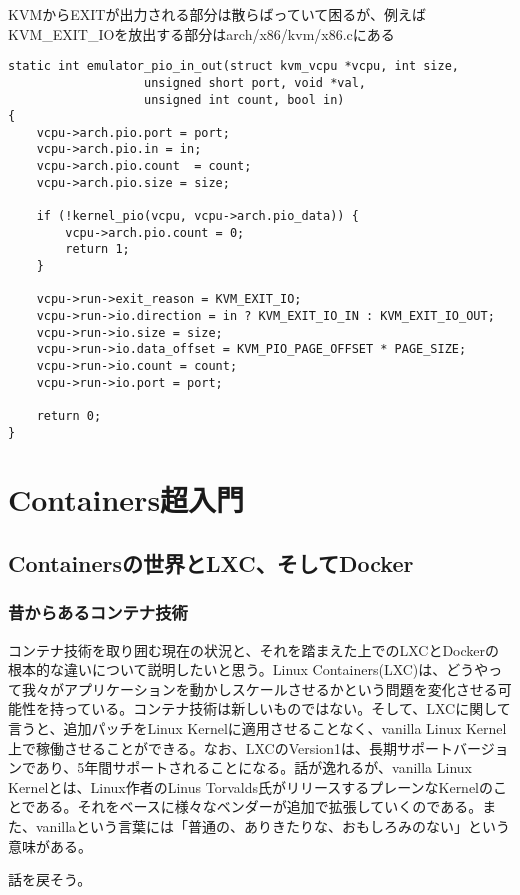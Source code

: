 \documentclass[9pt,b5paper,tombo]{jsbook}
\begin{document}
KVMからEXITが出力される部分は散らばっていて困るが、例えばKVM\_EXIT\_IOを放出する部分はarch/x86/kvm/x86.cにある

\begin{lstlisting}
static int emulator_pio_in_out(struct kvm_vcpu *vcpu, int size,
                   unsigned short port, void *val,
                   unsigned int count, bool in)
{
    vcpu->arch.pio.port = port;
    vcpu->arch.pio.in = in;
    vcpu->arch.pio.count  = count;
    vcpu->arch.pio.size = size;

    if (!kernel_pio(vcpu, vcpu->arch.pio_data)) {
        vcpu->arch.pio.count = 0;
        return 1;
    }

    vcpu->run->exit_reason = KVM_EXIT_IO;
    vcpu->run->io.direction = in ? KVM_EXIT_IO_IN : KVM_EXIT_IO_OUT;
    vcpu->run->io.size = size;
    vcpu->run->io.data_offset = KVM_PIO_PAGE_OFFSET * PAGE_SIZE;
    vcpu->run->io.count = count;
    vcpu->run->io.port = port;

    return 0;
}
\end{lstlisting}

\chapter{Containers超入門}

\section{Containersの世界とLXC、そしてDocker}

\subsection{昔からあるコンテナ技術}
コンテナ技術を取り囲む現在の状況と、それを踏まえた上でのLXCとDockerの根本的な違いについて説明したいと思う。Linux Containers(LXC)は、どうやって我々がアプリケーションを動かしスケールさせるかという問題を変化させる可能性を持っている。コンテナ技術は新しいものではない。そして、LXCに関して言うと、追加パッチをLinux Kernelに適用させることなく、vanilla Linux Kernel上で稼働させることができる。なお、LXCのVersion1は、長期サポートバージョンであり、5年間サポートされることになる。話が逸れるが、vanilla Linux Kernelとは、Linux作者のLinus Torvalds氏がリリースするプレーンなKernelのことである。それをベースに様々なベンダーが追加で拡張していくのである。また、vanillaという言葉には「普通の、ありきたりな、おもしろみのない」という意味がある。

\noindent
話を戻そう。
\end{document}
